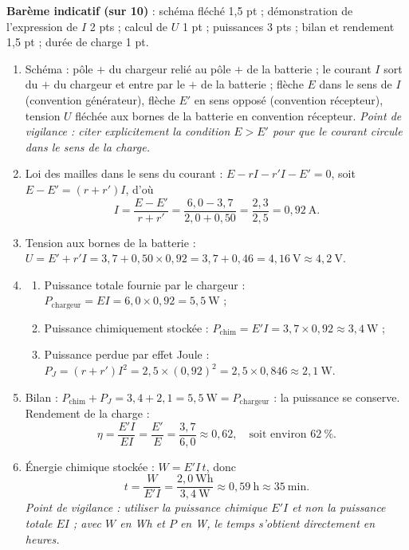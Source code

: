 \documentclass[11pt]{article}
\begin{document}
\begin{corrige}
\textbf{Barème indicatif (sur 10)} : schéma fléché 1,5 pt ; démonstration de l'expression de $I$ 2 pts ; calcul de $U$ 1 pt ; puissances 3 pts ; bilan et rendement 1,5 pt ; durée de charge 1 pt.
\begin{enumerate}
\item Schéma : pôle $+$ du chargeur relié au pôle $+$ de la batterie ; le courant $I$ sort du $+$ du chargeur et entre par le $+$ de la batterie ; flèche $E$ dans le sens de $I$ (convention générateur), flèche $E'$ en sens opposé (convention récepteur), tension $U$ fléchée aux bornes de la batterie en convention récepteur. \emph{Point de vigilance : citer explicitement la condition $E > E'$ pour que le courant circule dans le sens de la charge.}
\item Loi des mailles dans le sens du courant : $E - rI - r'I - E' = 0$, soit $E - E' = (r + r')I$, d'où
\[ I = \dfrac{E - E'}{r + r'} = \dfrac{6,0 - 3,7}{2,0 + 0,50} = \dfrac{2,3}{2,5} = 0,92~\text{A}. \]
\item Tension aux bornes de la batterie : $U = E' + r'I = 3,7 + 0,50 \times 0,92 = 3,7 + 0,46 = 4,16~\text{V} \approx 4,2~\text{V}$.
\item \begin{enumerate}
\item Puissance totale fournie par le chargeur : $P_{\text{chargeur}} = EI = 6,0 \times 0,92 = 5,5~\text{W}$ ;
\item Puissance chimiquement stockée : $P_{\text{chim}} = E'I = 3,7 \times 0,92 \approx 3,4~\text{W}$ ;
\item Puissance perdue par effet Joule : $P_J = (r + r')I^2 = 2,5 \times (0,92)^2 = 2,5 \times 0,846 \approx 2,1~\text{W}$.
\end{enumerate}
\item Bilan : $P_{\text{chim}} + P_J = 3,4 + 2,1 = 5,5~\text{W} = P_{\text{chargeur}}$ : la puissance se conserve. Rendement de la charge :
\[ \eta = \dfrac{E'I}{EI} = \dfrac{E'}{E} = \dfrac{3,7}{6,0} \approx 0,62, \quad \text{soit environ } 62~\%. \]
\item Énergie chimique stockée : $W = E'I\,t$, donc
\[ t = \dfrac{W}{E'I} = \dfrac{2,0~\text{Wh}}{3,4~\text{W}} \approx 0,59~\text{h} \approx 35~\text{min}. \]
\emph{Point de vigilance : utiliser la puissance chimique $E'I$ et non la puissance totale $EI$ ; avec $W$ en Wh et $P$ en W, le temps s'obtient directement en heures.}
\end{enumerate}
\end{corrige}
\end{document}
